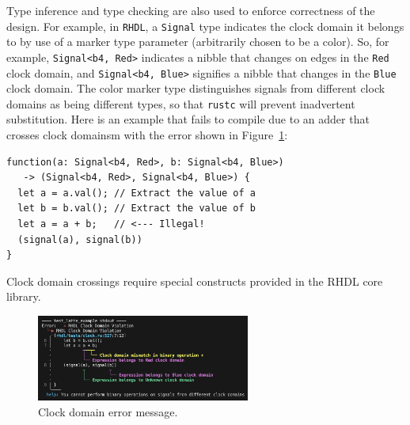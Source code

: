 \documentclass[sigplan,screen,sigconf]{acmart}
\begin{document}
Type inference and type checking are also used to enforce correctness of the design.  For example, in \verb|RHDL|, a \verb|Signal| type indicates the clock domain it belongs to by use of a marker type parameter (arbitrarily chosen to be a color).  So, for example, \verb|Signal<b4, Red>| indicates a nibble that changes on edges in the \verb|Red| clock domain, and \verb|Signal<b4, Blue>| signifies a nibble that changes in the \verb|Blue| clock domain.   The color marker type distinguishes signals from different clock domains as being different types, so that \verb|rustc| will prevent inadvertent substitution. Here is an example that fails to compile due to an adder that crosses clock domainsm with the error shown in Figure~\ref{fig:clock_error}:
\begin{verbatim}
function(a: Signal<b4, Red>, b: Signal<b4, Blue>) 
   -> (Signal<b4, Red>, Signal<b4, Blue>) {
  let a = a.val(); // Extract the value of a
  let b = b.val(); // Extract the value of b
  let a = a + b;   // <--- Illegal!
  (signal(a), signal(b))
}
\end{verbatim}
Clock domain crossings require special constructs provided in the RHDL core library.
\begin{figure}[!h]
  \centering
  \includegraphics[width=7.0cm]{clock_error.png}
  \caption{Clock domain error message. \label{fig:clock_error}}
\end{figure}
\end{document}
